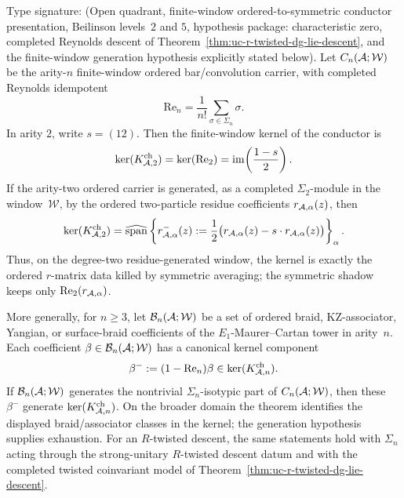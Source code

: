 \begin{theorem}
\label{thm:uc-degree-two-rmatrix-kernel}
\ClaimStatusProvedHere
{}
Type signature: \textup{(}Open quadrant, finite-window
ordered-to-symmetric conductor presentation, Beilinson levels~$2$ and
$5$, hypothesis package: characteristic zero, completed Reynolds
descent of Theorem~\ref{thm:uc-r-twisted-dg-lie-descent}, and the
finite-window generation hypothesis explicitly stated below\textup{)}.
Let \(C_n(\mathcal{A};\mathcal W)\) be the arity-\(n\) finite-window ordered
bar/convolution carrier, with completed Reynolds idempotent
\[
\mathrm{Re}_n=\frac1{n!}\sum_{\sigma\in\Sigma_n}\sigma .
\]
In arity \(2\), write \(s=(12)\).  Then the finite-window kernel of
the conductor is
\[
\ker(K_{\mathcal{A},2}^{\mathrm{ch}})
=
\ker(\mathrm{Re}_2)
=
\operatorname{im}\!\left(\frac{1-s}{2}\right).
\]
If the arity-two ordered carrier is generated, as a completed
\(\Sigma_2\)-module in the window~\(\mathcal W\), by the ordered
two-particle residue coefficients \(r_{\mathcal{A},\alpha}(z)\), then
\[
\ker(K_{\mathcal{A},2}^{\mathrm{ch}})
=
\widehat{\operatorname{span}}\left\{
r_{\mathcal{A},\alpha}^{-}(z):=
\frac12\bigl(r_{\mathcal{A},\alpha}(z)-s\cdot r_{\mathcal{A},\alpha}(z)\bigr)
\right\}_{\alpha}.
\]
Thus, on the degree-two residue-generated window, the kernel is
exactly the ordered \(r\)-matrix data killed by symmetric averaging;
the symmetric shadow keeps only
\(\mathrm{Re}_2(r_{\mathcal{A},\alpha})\).

More generally, for \(n\ge3\), let
\(\mathcal B_n(\mathcal{A};\mathcal W)\) be a set of ordered braid,
KZ-associator, Yangian, or surface-braid coefficients of the
\(E_1\)-Maurer--Cartan tower in arity~\(n\).  Each coefficient
\(\beta\in\mathcal B_n(\mathcal{A};\mathcal W)\) has a canonical kernel
component
\[
\beta^-:=(1-\mathrm{Re}_n)\beta\in\ker(K_{\mathcal{A},n}^{\mathrm{ch}}).
\]
If \(\mathcal B_n(\mathcal{A};\mathcal W)\) generates the nontrivial
\(\Sigma_n\)-isotypic part of \(C_n(\mathcal{A};\mathcal W)\), then these
\(\beta^-\) generate \(\ker(K_{\mathcal{A},n}^{\mathrm{ch}})\).  On the broader
domain the theorem identifies the displayed braid/associator classes
in the kernel; the generation hypothesis supplies exhaustion.
For an \(R\)-twisted descent, the same statements hold with
\(\Sigma_n\) acting through the strong-unitary \(R\)-twisted descent
datum and with the completed twisted coinvariant model of
Theorem~\ref{thm:uc-r-twisted-dg-lie-descent}.
\end{theorem}

